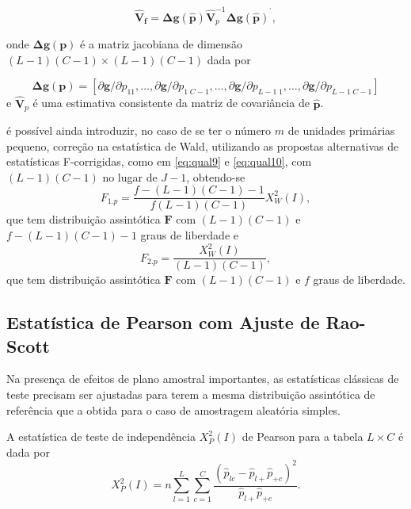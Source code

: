 \documentclass[]{book}
\numberwithin{example}{chapter}
\numberwithin{remark}{chapter}
\numberwithin{definition}{chapter}
\begin{document}
\begin{equation}
\mathbf{\hat{V}}_{\mathbf{f}}=\mathbf{\Delta g}\left( \mathbf{\hat{p}}
\right) \mathbf{\hat{V}}_{p}^{-1}\mathbf{\Delta g}\left( \mathbf{\hat{p}}
\right) ^{^{\prime }},  \label{eq:Tab11}
\end{equation}

onde \(\mathbf{\Delta g}\left( \mathbf{p}\right)\) é a matriz jacobiana
de dimensão
\(\left(L-1\right)\left( C-1\right)\times\left( L-1\right)\left( C-1\right)\)
dada por

\[
\mathbf{\Delta g}\left( \mathbf{p}\right) =\left[ \partial \mathbf{g}
/\partial p_{11},\ldots ,\partial \mathbf{g}/\partial p_{1\;C-1},\ldots
,\partial \mathbf{g}/\partial p_{L-1\;1},\ldots ,\partial \mathbf{g}
/\partial p_{L-1\;C-1}\right] 
\] e \(\mathbf{\hat{V}}_{p}\) é uma estimativa consistente da matriz de
covariância de \(\mathbf{\hat{p}}\).

é possível ainda introduzir, no caso de se ter o número \(m\) de
unidades primárias pequeno, correção na estatística de Wald, utilizando
as propostas alternativas de estatísticas F-corrigidas, como em
\eqref{eq:qual9} e \eqref{eq:qual10}, com
\(\left( L-1\right) \left( C-1\right)\) no lugar de \(J-1\), obtendo-se
\[
F_{1.p}=\frac{f-\left( L-1\right) \left( C-1\right) -1}{f\left( L-1\right)
\left( C-1\right) }X_{W}^{2}\left( I\right),
\] que tem distribuição assintótica \(\mathbf{F}\) com
\(\left(L-1\right) \left( C-1\right)\) e
\(f-\left( L-1\right) \left(C-1\right) -1\) graus de liberdade e \[
F_{2.p}=\frac{X_{W}^{2}\left( I\right) }{\left( L-1\right) \left( C-1\right) 
}, 
\] que tem distribuição assintótica \(\mathbf{F}\) com
\(\left(L-1\right) \left( C-1\right)\) e \(f\) graus de liberdade.

\subsection{Estatística de Pearson com Ajuste de
Rao-Scott}\label{estatistica-de-pearson-com-ajuste-de-rao-scott}

Na presença de efeitos de plano amostral importantes, as estatísticas
clássicas de teste precisam ser ajustadas para terem a mesma
distribuição assintótica de referência que a obtida para o caso de
amostragem aleatória simples.

A estatística de teste de independência \(X_{P}^{2}\left( I\right)\) de
Pearson para a tabela \(L\times C\) é dada por \[
X_{P}^{2}\left( I\right) =n\sum\limits_{l=1}^{L}\sum\limits_{c=1}^{C}\frac{
\left( \hat{p}_{lc}-\hat{p}_{l+}\hat{p}_{+c}\right) ^{2}}{\hat{p}_{l+}\hat{p}
_{+c}}.
\]
\end{document}
